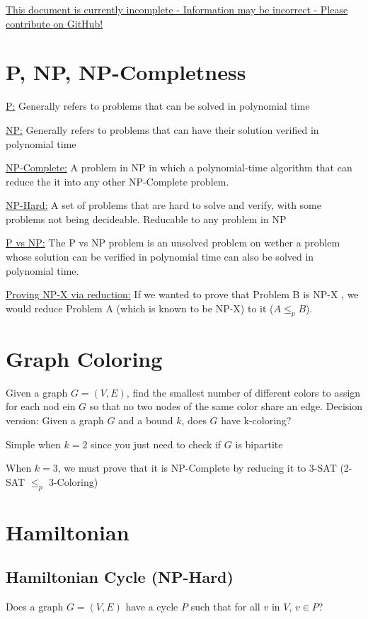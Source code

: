 \documentclass{article}
\begin{document}
\underline{This document is currently incomplete - Information may be incorrect - Please contribute on GitHub!}

\section{P, NP, NP-Completness}

\underline{P:} Generally refers to problems that can be solved in polynomial time

\underline{NP:} Generally refers to problems that can have their solution verified in polynomial time

\underline{NP-Complete:} A problem in NP in which a polynomial-time algorithm that can reduce
the it into any other NP-Complete problem. 

\underline{NP-Hard:} A set of problems that are hard to solve and verify, with some problems not being decideable. Reducable to any problem in NP

\underline{P vs NP:} The P vs NP problem is an unsolved problem on wether a problem whose solution can be
verified in polynomial time can also be solved in polynomial time. 

\underline{Proving NP-X via reduction:} If we wanted to prove that Problem B is NP-X
, we would reduce Problem A (which is known to be NP-X) to it ($A \leq_p B$). 

\section{Graph Coloring}
Given a graph $G = (V, E)$, find the smallest number of different colors to assign for 
each nod ein $G$ so that no two nodes of the same color share an edge. Decision version: 
Given a graph $G$ and a bound $k$, does $G$ have k-coloring?

Simple when $k=2$ since you just need to check if $G$ is bipartite

When $k=3$, we must prove that it is NP-Complete by reducing it to 3-SAT (2-SAT $\leq_p$ 3-Coloring)

\section{Hamiltonian}
\subsection{Hamiltonian Cycle (NP-Hard)}
Does a graph $G = (V, E)$ have a cycle $P$ such that for all $v$ in $V$, $v \in P$?
\end{document}
